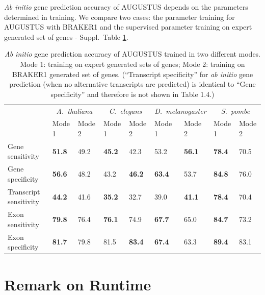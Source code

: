 \documentclass[a4paper,10pt]{report}
\begin{document}
\textit{Ab initio} gene prediction accuracy of AUGUSTUS depends on the parameters determined in training. We compare two cases: the parameter training for AUGUSTUS with BRAKER1 and the supervised parameter training on expert generated set of genes - Suppl.~Table \ref{single_preds_braker}.

\begin{table}[h!]
\caption{\textit{Ab initio} gene prediction accuracy of AUGUSTUS trained in two different modes. Mode 1: training on expert generated sets of genes; Mode 2: training on BRAKER1 generated set of genes. (``Transcript specificity'' for \textit{ab initio} gene prediction (when no alternative transcripts are predicted) is identical to ``Gene specificity'' and therefore is not shown in Table 1.4.) \label{single_preds_braker}}
\begin{center}
\begin{tabular}{lp{1.5cm}p{1.2cm}p{1.2cm}p{1.2cm}p{1.2cm}p{1.2cm}p{1.2cm}p{1.2cm}}\hline
 & \multicolumn{2}{c}{\textit{A.~thaliana}} &  \multicolumn{2}{c}{\textit{C.~elegans}} &  \multicolumn{2}{c}{\textit{D.~melanogaster}} &  \multicolumn{2}{c}{\textit{S.~pombe}}\\
 & \tiny{Mode 1} & \tiny{Mode 2} & \tiny{Mode 1} & \tiny{Mode 2} &  \tiny{Mode 1} & \tiny{Mode 2} & \tiny{Mode 1} &\tiny{Mode 2}\\
 \hline
Gene sensitivity        & \textbf{51.8} & 49.2 & \textbf{45.2} & 42.3 & 53.2 & \textbf{56.1} & \textbf{78.4} & 70.5 \\
Gene specificity        & \textbf{56.6} & 48.2 & 43.2 & \textbf{46.2} & \textbf{63.4} & 53.7 & \textbf{84.8} & 76.0  \\
Transcript sensitivity  & \textbf{44.2} & 41.6 & \textbf{35.2} & 32.7 & 39.0 & \textbf{41.1} & \textbf{78.4} & 70.4  \\
Exon sensitivity        & \textbf{79.8} & 76.4 & \textbf{76.1} & 74.9 & \textbf{67.7} & 65.0 & \textbf{84.7} & 73.2  \\
Exon specificity        & \textbf{81.7} & 79.8 & 81.5 & \textbf{83.4} & \textbf{67.4} & 63.3 & \textbf{89.4} & 83.1  \\
\hline
\end{tabular}
\end{center}
\end{table}

\section{Remark on Runtime}
\end{document}
